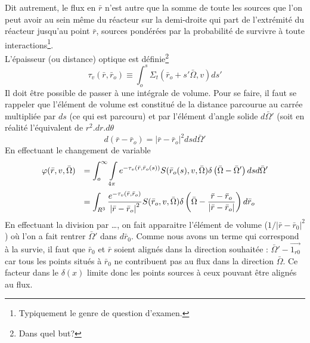Dit autrement, le flux en $\bar r$ n'est autre que la somme de toute les sources que l'on peut 
avoir au sein même du réacteur sur la demi-droite qui part de l'extrémité du réacteur jusqu'au point $\bar r$, sources pondérées par la probabilité de survivre à toute interactions\footnote{Typiquement le genre de question d'examen.}.\\

L'épaisseur (ou distance) optique est définie\footnote{Dans quel but?}
\begin{equation}
{\tau _v}(\bar r,{\bar r_o}) \equiv \int_o^s   {\Sigma _t}({\bar r_o} + s'\bar \Omega ,v)ds'
\end{equation}
Il doit être possible de passer à une intégrale de volume. Pour se faire, il faut se rappeler que 
l'élément de volume est constitué de la distance parcourue au carrée multipliée par $ds$ (ce qui 
est parcouru) et par l'élément d'angle solide $d\bar\Omega'$ (soit en réalité l'équivalent de $r^2.dr.d\theta$
\begin{equation}
d(\bar r - {\bar r_o}) = {\left| {\bar r - {{\bar r}_o}} \right|^2}dsd\bar \Omega '
\end{equation}
En effectuant le changement de variable
\begin{equation}
\begin{array}{ll}
\DS\varphi (\bar r,v,\bar \Omega ) &\DS= \int_o^\infty  {  \int\limits_{4\pi }    {e^{ - {\tau _v}(\bar r,{{\bar r}_o}(s))}}} S({\bar r_o}(s),v,\bar \Omega )\delta \left( {\bar \Omega  - \bar \Omega '} \right)dsd\bar \Omega '\vspace{2mm}\\
&\DS= \int_{{R^3}}^{} {  \frac{{{e^{ - {\tau _v}(\bar r,{{\bar r}_o})}}}}{{{{\left| {\bar r - {{\bar r}_o}} \right|}^2}}}} S({\bar r_o},v,\bar \Omega )\delta \left( {\bar \Omega  - \frac{{\bar r - {{\bar r}_o}}}{{\left| {\bar r - {{\bar r}_o}} \right|}}} \right)d{\bar r_o}
\end{array}
\end{equation}
En effectuant la division par \dots, on fait apparaitre l'élément de volume ($1/|\bar r -\bar r_0
|^2$) où l'on a fait rentrer $\bar\Omega'$ dans $d\bar r_0$. Comme nous avons  un terme qui 
correspond à la survie, il faut que $\bar r_0$ et $\bar r$ soient alignés dans la direction 
souhaitée : $\bar\Omega'-\vec{1_{r0}}$ car tous les points situés à $\bar r_0$ ne contribuent pas
au flux dans la direction $\bar\Omega$. Ce facteur dans le $\delta(x)$ limite donc les points sources
à ceux pouvant être alignés au flux. \\

